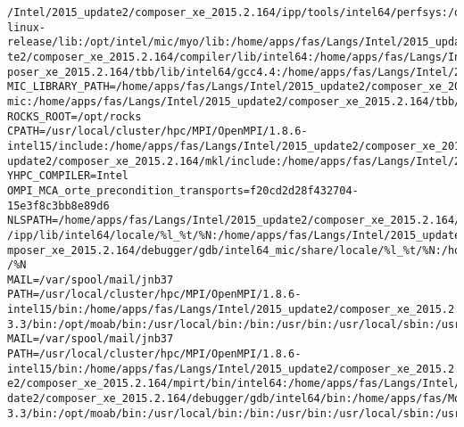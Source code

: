 \documentclass[11pt]{article}
\begin{document}
\begin{verbatim}
/Intel/2015_update2/composer_xe_2015.2.164/ipp/tools/intel64/perfsys:/opt/intel/mic/coi/host-linux-release/lib:/opt/intel/mic/myo/lib:/home/apps/fas/Langs/Intel/2015_upda
te2/composer_xe_2015.2.164/compiler/lib/intel64:/home/apps/fas/Langs/Intel/2015_update2/composer_xe_2015.2.164/mkl/lib/intel64:/home/apps/fas/Langs/Intel/2015_update2/com
poser_xe_2015.2.164/tbb/lib/intel64/gcc4.4:/home/apps/fas/Langs/Intel/2015_update2/composer_xe_2015.2.164/debugger/ipt/intel64/lib
MIC_LIBRARY_PATH=/home/apps/fas/Langs/Intel/2015_update2/composer_xe_2015.2.164/compiler/lib/mic:/home/apps/fas/Langs/Intel/2015_update2/composer_xe_2015.2.164/mpirt/lib/
mic:/home/apps/fas/Langs/Intel/2015_update2/composer_xe_2015.2.164/tbb/lib/mic
ROCKS_ROOT=/opt/rocks
CPATH=/usr/local/cluster/hpc/MPI/OpenMPI/1.8.6-intel15/include:/home/apps/fas/Langs/Intel/2015_update2/composer_xe_2015.2.164/ipp/include:/home/apps/fas/Langs/Intel/2015_
update2/composer_xe_2015.2.164/mkl/include:/home/apps/fas/Langs/Intel/2015_update2/composer_xe_2015.2.164/tbb/include
YHPC_COMPILER=Intel
OMPI_MCA_orte_precondition_transports=f20cd2d28f432704-15e3f8c3bb8e89d6
NLSPATH=/home/apps/fas/Langs/Intel/2015_update2/composer_xe_2015.2.164/compiler/lib/intel64/locale/%l_%t/%N:/home/apps/fas/Langs/Intel/2015_update2/composer_xe_2015.2.164
/ipp/lib/intel64/locale/%l_%t/%N:/home/apps/fas/Langs/Intel/2015_update2/composer_xe_2015.2.164/mkl/lib/intel64/locale/%l_%t/%N:/home/apps/fas/Langs/Intel/2015_update2/co
mposer_xe_2015.2.164/debugger/gdb/intel64_mic/share/locale/%l_%t/%N:/home/apps/fas/Langs/Intel/2015_update2/composer_xe_2015.2.164/debugger/gdb/intel64/share/locale/%l_%t
/%N
MAIL=/var/spool/mail/jnb37
PATH=/usr/local/cluster/hpc/MPI/OpenMPI/1.8.6-intel15/bin:/home/apps/fas/Langs/Intel/2015_update2/composer_xe_2015.2.164/bin/intel64:/home/apps/fas/Langs/Intel/2015_update2/composer_xe_2015.2.164/mpirt/bin/intel64:/home/apps/fas/Langs/Intel/2015_update2/composer_xe_2015.2.164/debugger/gdb/intel64_mic/bin:/home/apps/fas/Langs/Intel/2015_update2/composer_xe_2015.2.164/debugger/gdb/intel64/bin:/home/apps/fas/Modules:/usr/lib64/qt-3.3/bin:/opt/moab/bin:/usr/local/bin:/bin:/usr/bin:/usr/local/sbin:/usr/sbin:/s
MAIL=/var/spool/mail/jnb37
PATH=/usr/local/cluster/hpc/MPI/OpenMPI/1.8.6-intel15/bin:/home/apps/fas/Langs/Intel/2015_update2/composer_xe_2015.2.164/bin/intel64:/home/apps/fas/Langs/Intel/2015_updat
e2/composer_xe_2015.2.164/mpirt/bin/intel64:/home/apps/fas/Langs/Intel/2015_update2/composer_xe_2015.2.164/debugger/gdb/intel64_mic/bin:/home/apps/fas/Langs/Intel/2015_up
date2/composer_xe_2015.2.164/debugger/gdb/intel64/bin:/home/apps/fas/Modules:/usr/lib64/qt-3.3/bin:/opt/moab/bin:/usr/local/bin:/bin:/usr/bin:/usr/local/sbin:/usr/sbin:/s

\end{verbatim}
\end{document}
